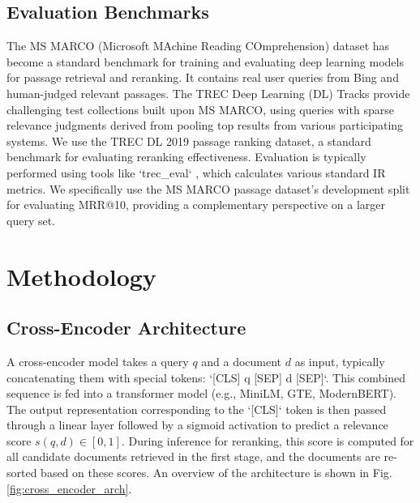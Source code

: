 \documentclass[conference]{IEEEtran}
\begin{document}
\subsection{Evaluation Benchmarks}
The MS MARCO (Microsoft MAchine Reading COmprehension) dataset \cite{bajaj2016ms, DBLP:journals/corr/NguyenRSGTMD16} has become a standard benchmark for training and evaluating deep learning models for passage retrieval and reranking. It contains real user queries from Bing and human-judged relevant passages. The TREC Deep Learning (DL) Tracks \cite{craswell2020overview, craswell2021overview} provide challenging test collections built upon MS MARCO, using queries with sparse relevance judgments derived from pooling top results from various participating systems. We use the TREC DL 2019 passage ranking dataset, a standard benchmark for evaluating reranking effectiveness. Evaluation is typically performed using tools like `trec\_eval` \cite{trec_eval_github}, which calculates various standard IR metrics. We specifically use the MS MARCO passage dataset's development split for evaluating MRR@10, providing a complementary perspective on a larger query set.

\section{Methodology}
\label{sec:methodology}

\subsection{Cross-Encoder Architecture}
A cross-encoder model takes a query $q$ and a document $d$ as input, typically concatenating them with special tokens: `[CLS] q [SEP] d [SEP]`. This combined sequence is fed into a transformer model (e.g., MiniLM, GTE, ModernBERT). The output representation corresponding to the `[CLS]` token is then passed through a linear layer followed by a sigmoid activation to predict a relevance score $s(q, d) \in [0, 1]$. During inference for reranking, this score is computed for all candidate documents retrieved in the first stage, and the documents are re-sorted based on these scores. An overview of the architecture is shown in Fig. \ref{fig:cross_encoder_arch}.
\end{document}
